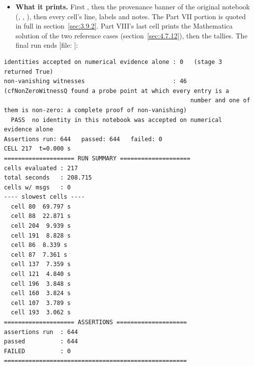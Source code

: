 \begin{itemize}
  \item \textbf{What it prints.} First , then the provenance banner of the original notebook (, , ), then every cell's line,  labels and notes. The Part VII portion is quoted in full in section~\ref{sec:3.9.2}. Part VIII's last cell prints the Mathematica solution of the two reference cases (section~\ref{sec:4.7.12}), then the tallies. The final run ends [file: ]:
\end{itemize}

\begin{Verbatim}
identities accepted on numerical evidence alone : 0   (stage 3 returned True)
non-vanishing witnesses                         : 46   (cfNonZeroWitnessQ found a probe point at which every entry is a
                                                     number and one of them is non-zero: a complete proof of non-vanishing)
  PASS  no identity in this notebook was accepted on numerical evidence alone
Assertions run: 644   passed: 644   failed: 0
CELL 217  t=0.000 s
==================== RUN SUMMARY ====================
cells evaluated : 217
total seconds   : 208.715
cells w/ msgs   : 0
---- slowest cells ----
  cell 80  69.797 s
  cell 88  22.871 s
  cell 204  9.939 s
  cell 191  8.828 s
  cell 86  8.339 s
  cell 87  7.361 s
  cell 137  7.359 s
  cell 121  4.840 s
  cell 196  3.848 s
  cell 160  3.824 s
  cell 107  3.789 s
  cell 193  3.062 s
==================== ASSERTIONS ====================
assertions run  : 644
passed          : 644
FAILED          : 0
====================================================
\end{Verbatim}

